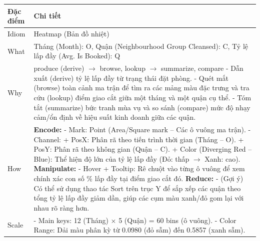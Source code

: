 \begin{longtable}{|p{2.8cm}|p{11.5cm}|}
\hline
\textbf{Đặc điểm} & \textbf{Chi tiết} \\
\hline
\endhead
\hline
\endfoot
Idiom & Heatmap (Bản đồ nhiệt) \\
\hline
What & Tháng (Month): O, Quận (Neighbourhood Group Cleansed): C, Tỷ lệ lấp đầy (Avg. Is Booked): Q \\
\hline
Why & produce (derive) $\rightarrow$ browse, lookup $\rightarrow$ summarize, compare \newline
\newline
- Dẫn xuất (derive) tỷ lệ lấp đầy từ trạng thái đặt phòng. \newline
\newline
- Quét mắt (browse) toàn cảnh ma trận để tìm ra các mảng màu đặc trưng và tra cứu (lookup) điểm giao cắt giữa một tháng và một quận cụ thể. \newline
\newline
- Tóm tắt (summarize) bức tranh mùa vụ và so sánh (compare) mức độ nhạy cảm/ổn định về hiệu suất kinh doanh giữa các quận. \\
\hline
How & \textbf{Encode:} \newline
\newline
- Mark: Point (Area/Square mark -- Các ô vuông ma trận). \newline
\newline
- Channel: \newline
\newline
\hspace{0.3cm} + PosX: Phân rã theo tiến trình thời gian (Tháng -- O). \newline
\newline
\hspace{0.3cm} + PosY: Phân rã theo không gian (Quận -- C). \newline
\newline
\hspace{0.3cm} + Color (Diverging Red -- Blue): Thể hiện độ lớn của tỷ lệ lấp đầy (Đỏ: thấp $\rightarrow$ Xanh: cao). \newline
\newline
\textbf{Manipulate:} \newline
\newline
- Hover + Tooltip: Rê chuột vào từng ô vuông để xem chính xác con số \% lấp đầy tại điểm giao cắt đó. \newline
\newline
\textbf{Reduce:} \newline
\newline
- (Gợi ý) Có thể sử dụng thao tác Sort trên trục Y để sắp xếp các quận theo tổng tỷ lệ lấp đầy giảm dần, giúp các cụm màu xanh/đỏ gom lại với nhau rõ ràng hơn. \\
\hline
Scale & - Main keys: 12 (Tháng) $\times$ 5 (Quận) = 60 bins (ô vuông). \newline
\newline
- Color Range: Dải màu phân kỳ từ 0.0980 (đỏ sẫm) đến 0.5857 (xanh sẫm). \\
\hline
\end{longtable}

